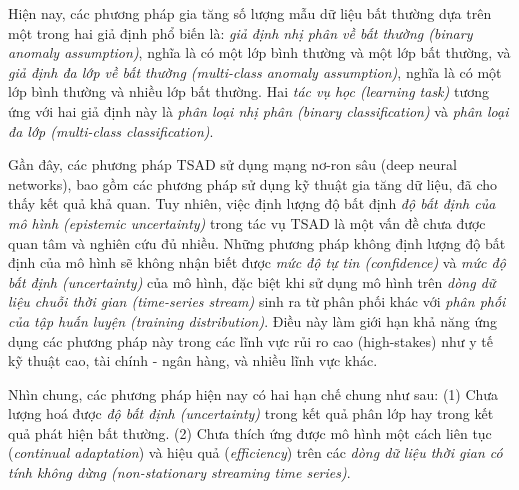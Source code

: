 Hiện nay, các phương pháp gia tăng số lượng mẫu dữ liệu bất thường dựa trên một trong hai giả định phổ biến là: \textit{giả định nhị phân về bất thường (binary anomaly assumption)}, nghĩa là có một lớp bình thường và một lớp bất thường, và \textit{giả định đa lớp về bất thường (multi-class anomaly assumption)}, nghĩa là có một lớp bình thường và nhiều lớp bất thường. Hai \textit{tác vụ học (learning task)} tương ứng với hai giả định này là \textit{phân loại nhị phân (binary classification)} và \textit{phân loại đa lớp (multi-class classification)}.

Gần đây, các phương pháp TSAD sử dụng mạng nơ-ron sâu (deep neural networks), bao gồm các phương pháp sử dụng kỹ thuật gia tăng dữ liệu, đã cho thấy kết quả khả quan. Tuy nhiên, việc định lượng độ bất định \textit{độ bất định của mô hình (epistemic uncertainty)} \cite{10.1145/3637528.3671936} trong tác vụ TSAD là một vấn đề chưa được quan tâm và nghiên cứu đủ nhiều. Những phương pháp không định lượng độ bất định của mô hình sẽ không nhận biết được \textit{mức độ tự tin (confidence)} và \textit{mức độ bất định (uncertainty)} của mô hình, đặc biệt khi sử dụng mô hình trên \textit{dòng dữ liệu chuỗi thời gian (time-series stream)} sinh ra từ phân phối khác với \textit{phân phối của tập huấn luyện (training distribution)}. Điều này làm giới hạn khả năng ứng dụng các phương pháp này trong các lĩnh vực rủi ro cao (high-stakes) như y tế kỹ thuật cao, tài chính - ngân hàng, và nhiều lĩnh vực khác.

Nhìn chung, các phương pháp hiện nay có hai hạn chế chung như sau: \newline
(1) Chưa lượng hoá được \textit{độ bất định (uncertainty)} trong kết quả phân lớp hay trong kết quả phát hiện bất thường. \newline
(2) Chưa thích ứng được mô hình một cách liên tục (\textit{continual adaptation}) và hiệu quả (\textit{efficiency}) trên các \textit{dòng dữ liệu thời gian có tính không dừng (non-stationary streaming time series)}.

